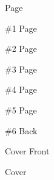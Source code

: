 \documentclass{article}
\begin{document}
	\sffamily\fontsize{60}{80}\selectfont
	\centering
	Page\par \#1\newpage
	Page\par \#2\newpage
	Page\par \#3\newpage
	Page\par \#4\newpage
	Page\par \#5\newpage
	Page\par \#6\newpage
	Back\par Cover \newpage
	Front\par Cover\newpage
\end{document}
